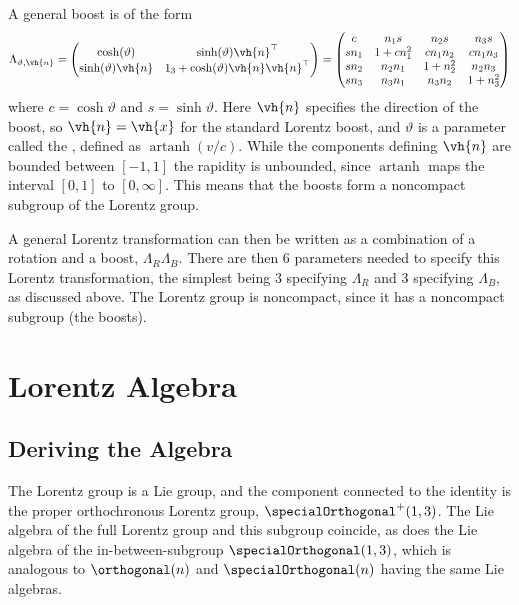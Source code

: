 \documentclass[fleqn]{NotesClass}
\newcommand{\ident}{1}
\newcommand{\trans}{\top}
\DeclareMathOperator{\artanh}{artanh}
\begin{document}
    A general boost is of the form
    \begin{equation*}
        \Lambda_{\vartheta, \vh{n}} = 
        \begin{pmatrix}
            \cosh(\vartheta) & \sinh(\vartheta) \vh{n}^\trans\\
            \sinh(\vartheta) \vh{n}  & \ident_3 + \cosh(\vartheta) \vh{n} \vh{n}^\trans
        \end{pmatrix}
        =
        \begin{pmatrix}
            c & n_1 s & n_2 s & n_3 s \\
            s n_1 & 1 + c n_1^2 & cn_1n_2 & cn_1n_3 \\
            s n_2 & n_2n_1 & 1 + n_2^2 & n_2n_3 \\
            s n_3 & n_3n_1 & n_3n_2 & 1 + n_3^2
        \end{pmatrix}
    \end{equation*}
    where \(c = \cosh \vartheta\) and \(s = \sinh \vartheta\).
    Here \(\vh{n}\) specifies the direction of the boost, so \(\vh{n} = \vh{x}\) for the standard Lorentz boost, and \(\vartheta\) is a parameter called the , defined as \(\artanh(v/c)\).
    While the components defining \(\vh{n}\) are bounded between \([-1, 1]\) the rapidity is unbounded, since \(\artanh\) maps the interval \([0, 1]\) to \([0, \infty]\).
    This means that the boosts form a noncompact subgroup of the Lorentz group.
    
    A general Lorentz transformation can then be written as a combination of a rotation and a boost, \(\Lambda_R\Lambda_B\).
    There are then 6 parameters needed to specify this Lorentz transformation, the simplest being 3 specifying \(\Lambda_R\) and 3 specifying \(\Lambda_B\), as discussed above.
    The Lorentz group is noncompact, since it has a noncompact subgroup (the boosts).
    
    \chapter{Lorentz Algebra}
    \section{Deriving the Algebra}
    The Lorentz group is a Lie group, and the component connected to the identity is the proper orthochronous Lorentz group, \(\specialOrthogonal^+(1, 3)\).
    The Lie algebra of the full Lorentz group and this subgroup coincide, as does the Lie algebra of the in-between-subgroup \(\specialOrthogonal(1, 3)\), which is analogous to \(\orthogonal(n)\) and \(\specialOrthogonal(n)\) having the same Lie algebras.
    
\end{document}
